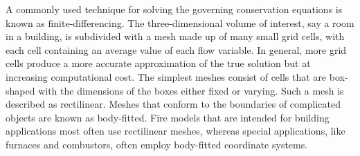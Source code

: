 \documentclass[graybox]{svmult}
\begin{document}
A commonly used technique for solving the governing conservation equations is known as finite-differencing. The three-dimensional volume of interest, say a room in a building, is subdivided with a mesh made up of many small grid cells, with each cell containing an average value of each flow variable. In general, more grid cells produce a more accurate approximation of the true solution but at increasing computational cost. The simplest meshes consist of cells that are box-shaped with the dimensions of the boxes either fixed or varying. Such a mesh is described as rectilinear. Meshes that conform to the boundaries of complicated objects are known as body-fitted. Fire models that are intended for building applications most often use rectilinear meshes, whereas special applications, like furnaces and combustors, often employ body-fitted coordinate systems.
\end{document}
